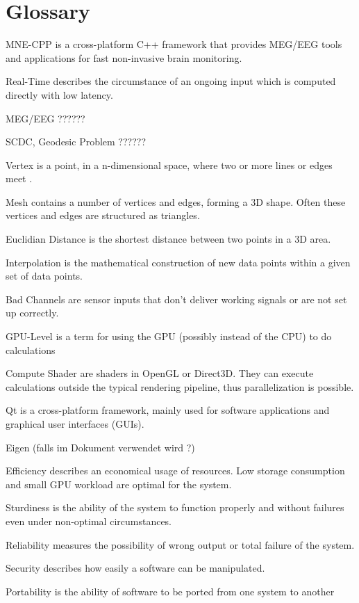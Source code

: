 \section{Glossary}

\begin{aims}
	
	\item[MNE-CPP] is a cross-platform C++ framework that provides MEG/EEG tools and applications for fast non-invasive brain monitoring.
	\item[Real-Time] describes the circumstance of an ongoing input which is computed directly with low latency.
	
	\item[MEG/EEG ??????] %
	\item[SCDC, Geodesic Problem ??????]
	\item[Vertex] is a point, in a n-dimensional space, where two or more lines or edges meet .
	\item[Mesh]	contains a number of vertices and edges, forming a 3D shape. Often these vertices and edges are structured as 					triangles.	
	\item[Euclidian Distance] is the shortest distance between two points in a 3D area.
	\item[Interpolation] is the mathematical construction of new data points within a given set of data points.
	\item[Bad Channels] are sensor inputs that don't deliver working signals or are not set up correctly.
	\item[GPU-Level] is a term for using the GPU (possibly instead of the CPU) to do calculations
	\item[Compute Shader] are shaders in OpenGL or Direct3D.%
	 They can execute calculations outside the typical rendering 								  pipeline, thus parallelization is possible.
	\item[Qt] is a cross-platform framework, mainly used for software applications and graphical user interfaces (GUIs). 
	\item[Eigen (falls im Dokument verwendet wird ?)]
	\item[Efficiency] describes an economical usage of resources. Low storage consumption and small GPU workload are optimal 					  	  for the system.
	\item[Sturdiness] is the ability of the system to function properly and without failures even under non-optimal 								  circumstances. 
	\item[Reliability] measures the possibility of wrong output or total failure of the system.
	\item[Security] describes how easily a software can be manipulated.
	\item[Portability] is the ability of software to be ported from one system to another

\end{aims}